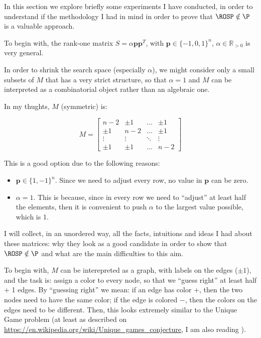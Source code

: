 In this section we explore briefly some experiments I have conducted, in order to understand if the methodology I had in mind in order to prove that $\ROSP\notin\P$ is a valuable approach.

To begin with, the rank-one matrix $S = \alpha \mathbf{p}\mathbf{p}^T$, with $\mathbf{p}\in\{-1,0,1\}^n$, $\alpha\in\mathbb{R}_{>0}$ is very general. 

In order to shrink the search space (especially $\alpha$), we might consider only a small subsets of $M$ that has a very strict structure, so that $\alpha = 1$ and $M$ can be interpreted as a combinatorial object rather than an algebraic one.

In my thughts, $M$ (symmetric) is:

\begin{equation}
\label{eq:matrix_M_combinatorial}
	M = \begin{bmatrix}
		n-2 & \pm 1 & \dots & \pm 1 \\
		\pm 1 & n - 2 & \dots & \pm 1 \\
		\vdots & \vdots & \ddots & \vdots \\
		\pm 1 & \pm 1 & \dots & n - 2
	\end{bmatrix}
\end{equation}

This is a good option due to the following reasons: 
\begin{itemize}
	\item $\mathbf{p}\in\{1,-1\}^n$. Since we need to adjust every row, no value in $\mathbf{p}$ can be zero.

	\item $\alpha=1$. This is because, since in every row we need to ``adjust'' at least half the elements, then it is convenient to push $\alpha$ to the largest value possible, which is 1. 
\end{itemize}

I will collect, in an unordered way, all the facts, intuitions and ideas I had about these matrices: why they look as a good candidate in order to show that $\ROSP\notin\P$ and what are the main difficulties to this aim.

\begin{intuition}
	To begin with, $M$ can be interepreted as a graph, with labels on the edges ($\pm 1$), and the task is: assign a color to every node, so that we ``guess right'' at least half + 1 edges. By ``guessing right'' we mean: if an edge has color $+$, then the two nodes need to have the same color; if the edge is colored $-$, then the colors on the edges need to be different. Then, this looks extremely similar to the Unique Game problem (at least as described on 
	\url{https://en.wikipedia.org/wiki/Unique_games_conjecture}, I am also reading \cite{svensson_approximation_2013}).
\end{intuition}

